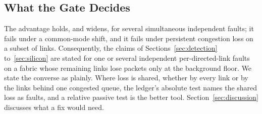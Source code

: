 \subsection{What the Gate Decides}

The advantage holds, and widens, for several simultaneous independent faults; it fails under a common-mode shift, and it fails under persistent congestion loss on a subset of links. Consequently, the claims of Sections~\ref{sec:detection} to~\ref{sec:silicon} are stated for one or several independent per-directed-link faults on a fabric whose remaining links lose packets only at the background floor. We state the converse as plainly. Where loss is shared, whether by every link or by the links behind one congested queue, the ledger's absolute test names the shared loss as faults, and a relative passive test is the better tool. Section~\ref{sec:discussion} discusses what a fix would need.
